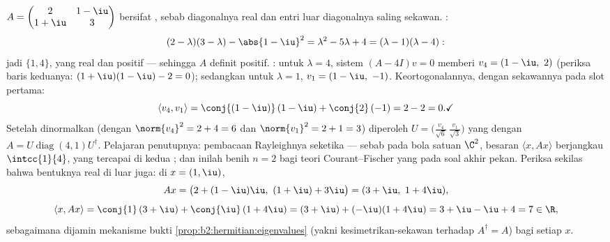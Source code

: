 \begin{example}\label{ex:b2:hermitian:pdrun}
$A = \begin{pmatrix} 2 & 1-\iu\\ 1+\iu & 3\end{pmatrix}$ bersifat
, sebab diagonalnya real dan entri luar diagonalnya saling
sekawan. :
\[
(2-\lambda)(3-\lambda) - \abs{1-\iu}^2
= \lambda^2 - 5\lambda + 4
= (\lambda - 1)(\lambda - 4) :
\]
jadi  $\{1, 4\}$, yang real dan positif --- sehingga $A$ definit
positif. : untuk $\lambda = 4$, sistem $(A -
4I)v = 0$ memberi $v_4 = (1 - \iu,\ 2)$ (periksa baris keduanya:
$(1+\iu)(1-\iu) - 2 = 0$); sedangkan untuk $\lambda = 1$, $v_1 = (1 - \iu,\
-1)$. Keortogonalannya, dengan sekawannya pada slot pertama:
\[
\langle v_4, v_1\rangle
= \conj{(1-\iu)}\,(1-\iu) + \conj{2}\,(-1)
= 2 - 2 = 0 . \checkmark
\]
Setelah dinormalkan (dengan $\norm{v_4}^2 = 2 + 4 = 6$ dan $\norm{v_1}^2 = 2 + 1
= 3$) diperoleh $U = \bigl(\frac{v_4}{\sqrt6}\
\frac{v_1}{\sqrt3}\bigr)$ yang  dengan $A =
U\operatorname{diag}(4,1)U^\dagger$. Pelajaran penutupnya:
pembacaan Rayleighnya seketika --- sebab pada bola satuan
$\C^2$, besaran $\langle x, Ax\rangle$ berjangkau $\intcc{1}{4}$,
yang tercapai di kedua ; dan inilah benih $n = 2$ bagi
teori Courant--Fischer yang  pada soal akhir pekan.
Periksa sekilas bahwa bentuknya real di luar \omterm{def:b2:reduction:eigen}{vektor eigennya} juga: di
$x = (1, \iu)$,
\[
Ax = \bigl(2 + (1-\iu)\iu,\ (1+\iu) + 3\iu\bigr)
= (3 + \iu,\ 1 + 4\iu),
\]
\[
\langle x, Ax\rangle = \conj{1}\,(3+\iu) +
\conj{\iu}\,(1+4\iu)
= (3 + \iu) + (-\iu)(1 + 4\iu) = 3 + \iu - \iu + 4 = 7 \in
\R ,
\]
sebagaimana dijamin mekanisme bukti \cref{prop:b2:hermitian:eigenvalues}
(yakni kesimetrikan-sekawan terhadap $A^\dagger = A$) bagi
setiap $x$.
\end{example}


